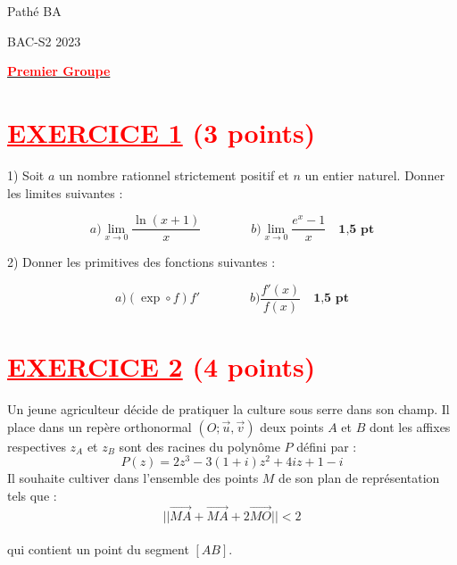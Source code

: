 \documentclass[12pt]{article}
\begin{document}
\begin{minipage}{0.8\textwidth}
	Pathé BA                          
\end{minipage}
\begin{minipage}{0.8\textwidth}
	BAC-S2 2023
\end{minipage}

\begin{center}
\textbf{{\underline{\textcolor{red}{Premier Groupe}}}}
\end{center}





\section*{\textcolor{red}{\underline{EXERCICE 1} (3 points) }}
1) Soit \(a\) un nombre rationnel strictement positif et \(n\) un entier naturel. Donner les limites suivantes :

\[
a) \lim_{x \to 0} \frac{\ln(x+1)}{x}\quad\quad\quad\quad b) \lim_{x \to 0} \frac{e^x - 1}{x}\quad \textbf{1,5 pt} \]


2) Donner les primitives des fonctions suivantes :

\[
a) ( \exp \circ f)f' \quad\quad\quad\quad  b) \frac{f'(x)}{f(x)}  \quad \textbf{1,5 pt}
\]

\section*{\textcolor{red}{\underline{EXERCICE 2} (4 points) }}
Un jeune agriculteur décide de pratiquer la culture sous serre dans son champ. Il place dans un repère orthonormal \( (O; \vec{u}, \vec{v}) \) deux points \( A \) et \( B \) dont les affixes respectives \( z_A \) et \( z_B \) sont des racines du polynôme \( P \) défini par :
\[
P(z) = 2z^3 - 3(1+i)z^2 + 4iz + 1 - i
\]
Il souhaite cultiver dans l'ensemble des points \( M \) de son plan de représentation tels que :
\[
||\overrightarrow{MA} + \overrightarrow{MA} + 2\overrightarrow{MO}|| < 2
\]\\
qui contient un point du segment \( [AB] \).
\end{document}
